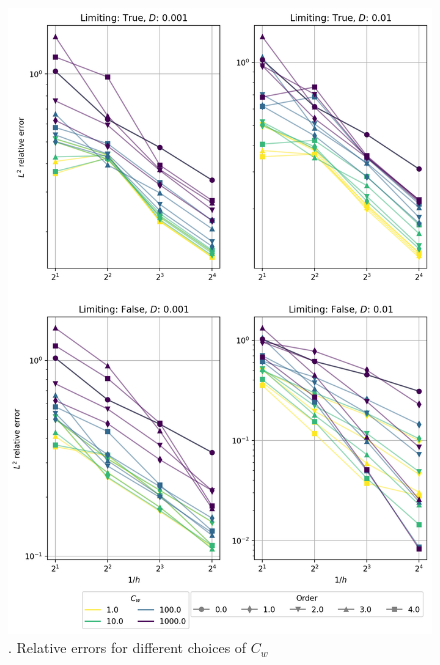 %
%

\begin{figure}[p!]
	\centering
	\includegraphics[width=\textwidth]{../figs/parametric/burgers_1D/convergences}
	\caption{. Relative errors for different choices of $C_w$}
	\label{fig:burgers_conv}
\end{figure}
\clearpage

